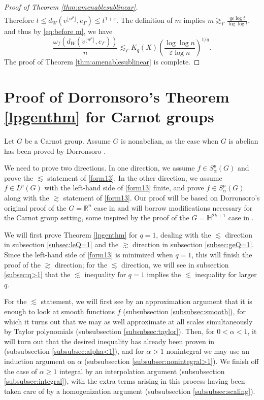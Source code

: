 \documentclass[11pt,reqno]{amsart}
\newcommand{\1}{\mathbf 1}
\begin{document}
\begin{proof}[Proof of Theorem \ref{thm:amenablesublinear}]
\begin{align*}
\end{align*}
Therefore $t\le d_W\left(v^{\lfloor n^\rho\rfloor},e_\Gamma\right)\le t^{1+\varepsilon}$. The definition of $m$ implies $m\gtrsim_\Gamma \frac{q\varepsilon \log t}{\log\log t}$, and
thus by \eqref{eq:before m}, we have
$$
\frac{\omega_f\left(d_W\left(v^{\lfloor n^\rho\rfloor},e_\Gamma\right)\right)}{n}\lesssim_\Gamma K_q\left(X\right)\left(\frac{\log\log n}{\varepsilon\log
n}\right)^{1/q}.
$$
The proof of Theorem \ref{thm:amenablesublinear} is complete.
\end{proof}






\section{Proof of Dorronsoro's Theorem \ref{lpgenthm} for Carnot groups}\label{sec:dorronsoro}
Let $G$ be a Carnot group. Assume $G$ is nonabelian, as the case when $G$ is abelian has been proved by Dorronsoro \cite{dorronsoro1985characterization}.

We need to prove two directions. In one direction, we assume $f\in S^p_\alpha\left(G\right)$ and prove the $\lesssim$ statement of \eqref{form13}. In the other direction, we assume $f\in L^p\left(G\right)$ with the left-hand side of \eqref{form13} finite, and prove $f\in S^p_\alpha\left(G\right)$ along with the $\gtrsim$ statement of \eqref{form13}. Our proof will be based on Dorronsoro's original proof of the $G=\mathbb{R}^n$ case in \cite{dorronsoro1985characterization} and will borrow modifications necessary for the Carnot group setting, some inspired by the proof of the $G=\mathbb{H}^{2k+1}$ case in \cite{fassler2020dorronsoro}.

We will first prove Theorem \ref{lpgenthm} for $q=1$, dealing with the $\lesssim$ direction in subsection \ref{subsec:leQ=1} and the $\gtrsim$ direction in subsection \ref{subsec:geQ=1}. Since the left-hand side of \eqref{form13} is minimized when $q=1$, this will finish the proof of the $\gtrsim$ direction; for the $\lesssim$ direction, we will see in subsection \ref{subsec:q>1} that the $\lesssim$ inequality for $q=1$ implies the $\lesssim$ inequality for larger $q$.

For the $\lesssim$ statement, we will first see by an approximation argument that it is enough to look at smooth functions $f$ (subsubsection \ref{subsubsec:smooth}), for which it turns out that we may as well approximate at all scales simultaneously by Taylor polynomials (subsubsection \ref{subsubsec:taylor}). Then, for $0<\alpha<1$, it will turn out that the desired inequality has already been proven in \cite[Theorem 5]{coulhon2001sobolev} (subsubsection \ref{subsubsec:alpha<1}), and for $\alpha>1$ nonintegral we may use an induction argument on $\alpha$ (subsubsection \ref{subsubsec:nonintegral>1}). We finish off the case of $\alpha\ge 1$ integral by an interpolation argument (subsubsection \ref{subsubsec:integral}), with the extra terms arising in this process having been taken care of by a homogenization argument (subsubsection \ref{subsubsec:scaling}).
\end{document}
